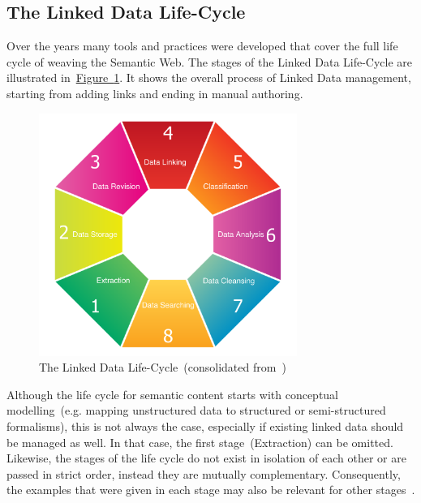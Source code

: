 \subsection{The Linked Data Life-Cycle}
Over the years many tools and practices were developed that cover the full life cycle of weaving the Semantic Web. The stages of the Linked Data Life-Cycle are illustrated in~\hyperref[fig:linked_data_life_cycle]{Figure~\ref*{fig:linked_data_life_cycle}}. It shows the overall process of Linked Data management, starting from adding links and ending in manual authoring. 
\begin{figure}
	 \centering
	 \includegraphics[width=0.75\textwidth]{drawio/Linked_Data_Life_Cycle}
	 \caption{The Linked Data Life-Cycle~(consolidated from~\cite{auer2011, auer2012, siorpaes2008})}\label{fig:linked_data_life_cycle}
\end{figure}  
Although the life cycle for semantic content starts with conceptual modelling~(e.g. mapping unstructured data to structured or semi-structured formalisms), this is not always the case, especially if existing linked data should be managed as well. In that case, the first stage~(Extraction) can be omitted. Likewise, the stages of the life cycle do not exist in isolation of each other or are passed in strict order, instead they are mutually complementary. Consequently, the examples that were given in each stage may also be relevant for other stages~\cite{simperl2013}. 

